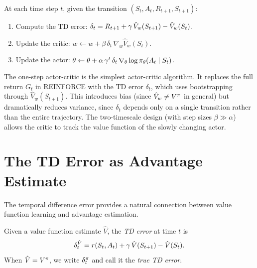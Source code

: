 \documentclass[11pt,a4paper]{article}
\begin{document}
\begin{definition}
\label{def:one-step-ac}
At each time step $t$, given the transition $(S_t, A_t, R_{t+1}, S_{t+1})$:
\begin{enumerate}[label=\arabic*.]
  \item Compute the TD error: $\delta_t = R_{t+1} + \gamma\,
    \hat{V}_w(S_{t+1}) - \hat{V}_w(S_t)$.
  \item Update the critic: $w \leftarrow w + \beta\, \delta_t\,
    \nabla_w \hat{V}_w(S_t)$.
  \item Update the actor: $\theta \leftarrow \theta + \alpha\,
    \gamma^t\, \delta_t\, \nabla_\theta \log
    \pi_\theta(A_t \mid S_t)$.
\end{enumerate}
\end{definition}

\begin{rlconnection}
The one-step actor-critic is the simplest actor-critic algorithm. It
replaces the full return $G_t$ in REINFORCE with the TD error $\delta_t$,
which uses bootstrapping through $\hat{V}_w(S_{t+1})$. This introduces
bias (since $\hat{V}_w \neq V^{\pi}$ in general) but dramatically reduces
variance, since $\delta_t$ depends only on a single transition rather
than the entire trajectory. The two-timescale design (with step sizes
$\beta \gg \alpha$) allows the critic to track the value function of the
slowly changing actor.
\end{rlconnection}

\section{The TD Error as Advantage Estimate}

The temporal difference error provides a natural connection between
value function learning and advantage estimation.

\begin{definition}
\label{def:td-error}
Given a value function estimate $\hat{V}$, the \emph{TD error} at
time $t$ is
\[
  \delta_t^{\hat{V}} = r(S_t, A_t) + \gamma\, \hat{V}(S_{t+1})
  - \hat{V}(S_t).
\]
When $\hat{V} = V^{\pi}$, we write $\delta_t^\pi$ and call it the
\emph{true TD error}.
\end{definition}
\end{document}
